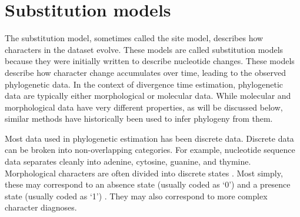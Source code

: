 \documentclass[11pt]{article}
\begin{document}


\section{Substitution models}

The substitution model, sometimes called the site model, describes how characters in the dataset evolve.
These models are called substitution models because they were initially written to describe nucleotide changes.
These models describe how character change accumulates over time, leading to the observed phylogenetic data.
In the context of divergence time estimation, phylogenetic data are typically either morphological or molecular data. 
While molecular and morphological data have very different properties, as will be discussed below, similar methods have historically been used to infer phylogeny from them.

Most data used in phylogenetic estimation has been discrete data.
Discrete data can be broken into non-overlapping categories.
For example, nucleotide sequence data separates cleanly into adenine, cytosine, guanine, and thymine.
Morphological characters are often divided into discrete states \cite{de1985ontogenetic}.
Most simply, these may correspond to an absence state (usually coded as `0') and a presence state (usually coded as `1') \cite{watrous1981}.
They may also correspond to more complex character diagnoses.
\end{document}

